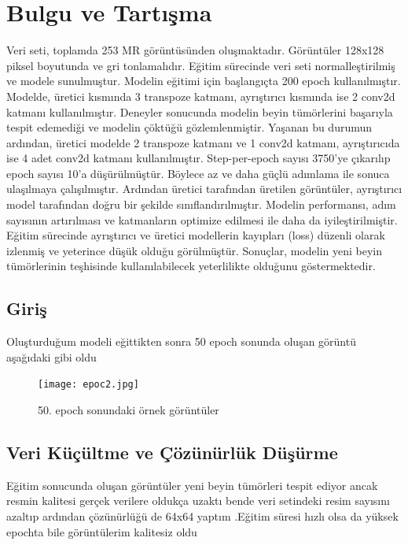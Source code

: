 \documentclass[10pt]{article}
\begin{document}
	
	
	
	
	
	
	\section{Bulgu ve Tartışma}
	Veri seti, toplamda 253 MR görüntüsünden oluşmaktadır. Görüntüler 128x128 piksel boyutunda ve gri tonlamalıdır. Eğitim sürecinde veri seti normalleştirilmiş ve modele sunulmuştur. Modelin eğitimi için başlangıçta 200 epoch kullanılmıştır. Modelde, üretici kısmında 3 transpoze katmanı, ayrıştırıcı kısmında ise 2 conv2d katmanı kullanılmıştır. Deneyler sonucunda modelin beyin tümörlerini başarıyla tespit edemediği ve modelin çöktüğü gözlemlenmiştir. Yaşanan bu durumun ardından, üretici modelde 2 transpoze katmanı ve 1 conv2d katmanı, ayrıştırıcıda ise 4 adet conv2d katmanı kullanılmıştır. Step-per-epoch sayısı 3750'ye çıkarılıp epoch sayısı 10'a düşürülmüştür. Böylece az ve daha güçlü adımlama ile sonuca ulaşılmaya çalışılmıştır. Ardından üretici tarafından üretilen görüntüler, ayrıştırıcı model tarafından doğru bir şekilde sınıflandırılmıştır. Modelin performansı, adım sayısının artırılması ve katmanların optimize edilmesi ile daha da iyileştirilmiştir. Eğitim sürecinde ayrıştırıcı ve üretici modellerin kayıpları (loss) düzenli olarak izlenmiş ve yeterince düşük olduğu görülmüştür. Sonuçlar, modelin yeni beyin tümörlerinin teşhisinde kullanılabilecek yeterlilikte olduğunu göstermektedir.
	
	
	
	\maketitle
	
	\subsection{Giriş }
	Oluşturduğum modeli eğittikten sonra 50 epoch sonunda oluşan görüntü aşağıdaki gibi oldu 
	
	\begin{figure}[htbp]
		\centering
		\texttt{[image: epoc2.jpg]}
		\caption{50. epoch sonundaki örnek görüntüler  }
		\label{fig:uretici_tuketici}
	\end{figure}
	
	\subsection{Veri Küçültme ve Çözünürlük Düşürme}
	Eğitim sonucunda oluşan görüntüler yeni beyin tümörleri tespit ediyor ancak resmin kalitesi gerçek verilere oldukça uzaktı bende veri setindeki resim sayısını azaltıp ardından çözünürlüğü de 64x64 yaptım .Eğitim süresi hızlı olsa da yüksek epochta bile görüntülerim kalitesiz oldu 
	
\end{document}
